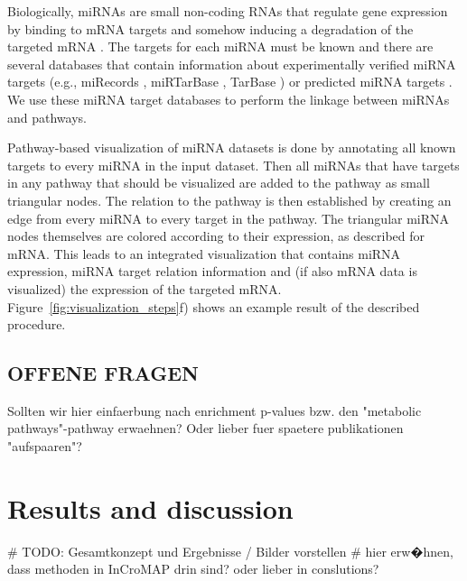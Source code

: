 \documentclass{bioinfo}
\begin{document}
Biologically, miRNAs are small non-coding RNAs that regulate gene expression by binding to mRNA
targets and somehow inducing a degradation of the targeted mRNA \citep{Bartel2004}. The targets for
each miRNA must be known and there are several databases that contain information about
experimentally verified miRNA targets (e.g., miRecords \citep[see][]{miRecords}, miRTarBase
\citep[see][]{miRTarBase}, TarBase \citep[see][]{TarBase}) or predicted miRNA targets
\citep{Alexiou2009}. We use these miRNA target databases to perform the linkage between miRNAs and
pathways.

Pathway-based visualization of miRNA datasets is done by annotating all known targets to every miRNA
in the input dataset. Then all miRNAs that have targets in any pathway that should be visualized are
added to the pathway as small triangular nodes. The relation to the pathway is then established by
creating an edge from every miRNA to every target in the pathway. The triangular miRNA nodes
themselves are colored according to their expression, as described for mRNA.  This leads to an
integrated visualization that contains miRNA expression, miRNA target relation information and (if
also mRNA data is visualized) the expression of the targeted
mRNA. Figure~\ref{fig:visualization_steps}f) shows an example result of the described procedure.


\subsection{OFFENE FRAGEN} 

Sollten wir hier einfaerbung nach enrichment p-values bzw. den "metabolic
pathways"-pathway erwaehnen? Oder lieber fuer spaetere publikationen "aufspaaren"?




\section{Results and discussion}

# TODO: Gesamtkonzept und Ergebnisse / Bilder vorstellen
# hier erw�hnen, dass methoden in InCroMAP drin sind? oder lieber in conslutions?
\end{document}
